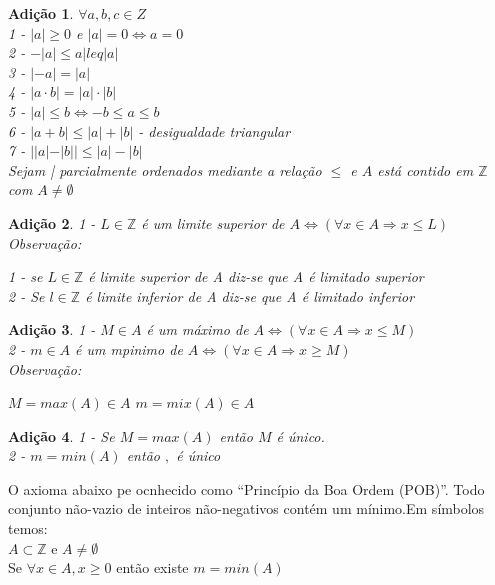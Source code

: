 \documentclass[a4paper,12pt]{article}
\newtheorem{add}{Adição}
\begin{document}
\begin{add} %
  $\forall a, b,c \in Z$\\

  1 - $|a| \ge 0 $ e $|a| = 0 \iff a = 0$\\
  2 - $-|a| \leq a |leq |a|$\\
  3 - $|-a| = |a|$\\
  4 - $|a \cdot b| = |a|\cdot|b|$\\
  5 - $|a| \leq b  \iff -b \leq a \leq b$\\
  6 - $|a + b| \leq |a| + |b|$ - desigualdade triangular\\
  7 - $ ||a| - |b|| \leq |a| - |b|$\\

  Sejam | parcialmente ordenados mediante a relação $\leq$ e $A $ está contido em $\mathbb{Z}$ com $A \neq \emptyset$
\end{add}

\begin{add} %
  1 - $L \in \mathbb{Z}$ é  um limite superior de $A  \iff (\forall x \in A \Longrightarrow x \leq L) $\\

Observação:

1 - se $L \in \mathbb{Z}$ é limite superior de A diz-se que A é limitado superior\\
2 - Se $l \in \mathbb{Z}$ é limite inferior de A diz-se que A é limitado inferior\\
\end{add}

\begin{add} %
  1 - $M \in A$ é um máximo de $A  \iff (\forall x \in A \Longrightarrow x \leq M) $\\
  2 - $m \in A$ é um mpinimo de $A \iff (\forall x \in A \Longrightarrow x \geq M) $ \\

  Observação:
  
  $M = max(A) \in A$
  $m = mix(A) \in A$
\end{add}

\begin{add} %
  1 - Se $M = max(A)$ então $M$ é único.\\
  2 - $m  = min(A)$ então $,$ é único \\
\end{add}

O axioma abaixo pe ocnhecido como ``Princípio da Boa Ordem (POB)''. Todo conjunto não-vazio de inteiros não-negativos contém um mínimo.Em símbolos temos:\\
$A \subset \mathbb{Z}$ e $A \neq \emptyset$\\
Se $\forall x \in A, x \ge 0$ então existe $m = min(A)$
\end{document}
